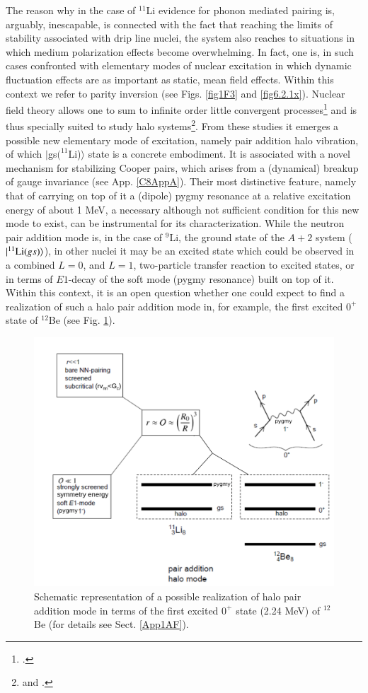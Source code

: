  The reason why in the case of $^{11}$Li evidence for phonon mediated pairing is, arguably, inescapable, is connected with the fact that reaching the limits of stability associated with drip line nuclei, the system also reaches to situations in which medium polarization effects become overwhelming. In fact, one is, in such cases confronted with elementary modes of nuclear excitation in which dynamic fluctuation effects are as important as static, mean field effects. Within this context we refer to  parity inversion (see Figs. \ref{fig1F3}  and \ref{fig6.2.1x}). Nuclear field theory  allows one to sum to infinite order little convergent processes\footnote{\cite{Bortignon:78}.} and is thus specially suited to study halo systems\footnote{\citet{Barranco:01} and \citet{Gori:04}.}. From these studies it emerges a possible new elementary mode of excitation, namely pair addition halo vibration, of which $|$gs$(^{11}$Li)$\rangle$ state is a concrete embodiment. It is associated with a novel mechanism  for stabilizing Cooper pairs, which arises from a (dynamical) breakup of gauge invariance (see App. \ref{C8AppA}). Their most distinctive feature, namely that of carrying on top of it a (dipole) pygmy resonance at a relative excitation energy of about 1 MeV, a necessary although not sufficient condition for this new mode to exist, can be instrumental for its characterization. While the neutron pair addition mode is, in the case of $^9$Li, the ground state of the $A+2$ system ($|{^{11}\text{Li}(gs)} \rangle$), in other nuclei  it may be an excited state which could  be  observed in a combined $L=0$, and $L=1$, two-particle transfer reaction to excited states, or in terms of $E1$-decay of the soft mode (pygmy resonance) built on top of it. Within this context, it is an open question whether one could expect to find  a realization of such a halo pair addition mode in, for example, the first excited $0^+$ state of $^{12}$Be (see Fig. \ref{fig8_2_4x}).
   \begin{figure}
   \centerline{\includegraphics*[width=12cm,angle=0]{C8/figsC8/pigmy}}
   	\caption{Schematic representation of a possible realization of halo pair addition mode in terms of the first excited $0^+$ state (2.24 MeV) of $^{12}$Be (for details see Sect. \ref{App1AF}).}\label{fig8_2_4x}
   \end{figure}
   
